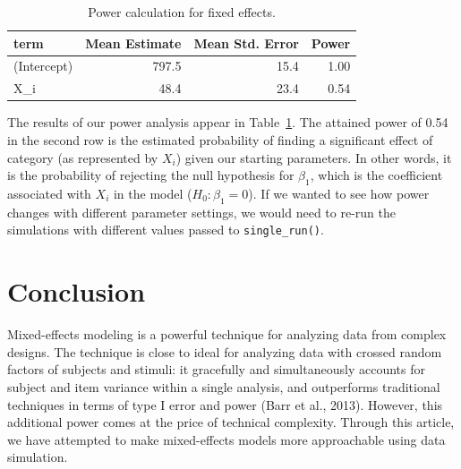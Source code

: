 \documentclass[
  english,
  doc,floatsintext]{apa6}
\begin{document}
\begin{table}[H]

\begin{center}
\begin{threeparttable}

\caption{\label{tab:calc-power-table}Power calculation for fixed effects.}

\begin{tabular}{lrrr}
\toprule
term & \multicolumn{1}{c}{Mean Estimate} & \multicolumn{1}{c}{Mean Std. Error} & \multicolumn{1}{c}{Power}\\
\midrule
(Intercept) & 797.5 & 15.4 & 1.00\\
X\_i & 48.4 & 23.4 & 0.54\\
\bottomrule
\end{tabular}

\end{threeparttable}
\end{center}

\end{table}

The results of our power analysis appear in Table~\ref{tab:calc-power-table}. The attained power of 0.54 in the second row is the estimated probability of finding a significant effect of category (as represented by \(X_i\)) given our starting parameters. In other words, it is the probability of rejecting the null hypothesis for \(\beta_1\), which is the coefficient associated with \(X_i\) in the model (\(H_0: \beta_1 = 0\)). If we wanted to see how power changes with different parameter settings, we would need to re-run the simulations with different values passed to \texttt{single\_run()}.

\hypertarget{conclusion}{%
\section{Conclusion}\label{conclusion}}

Mixed-effects modeling is a powerful technique for analyzing data from complex designs. The technique is close to ideal for analyzing data with crossed random factors of subjects and stimuli: it gracefully and simultaneously accounts for subject and item variance within a single analysis, and outperforms traditional techniques in terms of type I error and power (Barr et al., 2013). However, this additional power comes at the price of technical complexity. Through this article, we have attempted to make mixed-effects models more approachable using data simulation.
\end{document}
